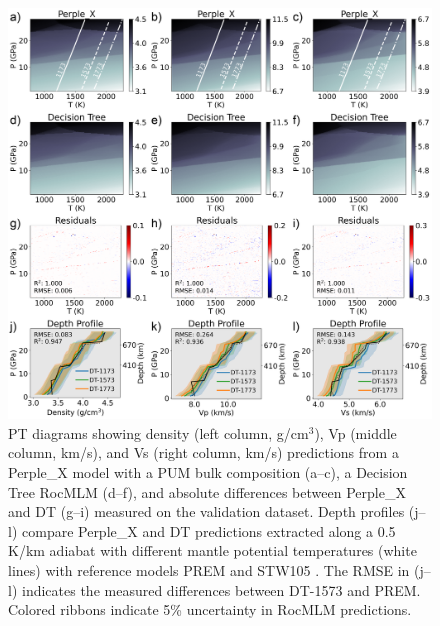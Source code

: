 \documentclass[draft,linenumbers]{agujournal2018}
\begin{document}
\begin{figure}[htbp]

{\centering \includegraphics[width=1\linewidth,]{image12-PUM-DT} 

}

\caption{PT diagrams showing density (left column, g/cm\(^3\)), Vp (middle column, km/s), and Vs (right column, km/s) predictions from a Perple\_X model with a PUM bulk composition (a--c), a Decision Tree RocMLM (d--f), and absolute differences between Perple\_X and DT (g--i) measured on the validation dataset. Depth profiles (j--l) compare Perple\_X and DT predictions extracted along a 0.5 K/km adiabat with different mantle potential temperatures (white lines) with reference models PREM \citep[solid black line,][]{dziewonski1981} and STW105 \citep[dotted black line,][]{kustowski2008}. The RMSE in (j--l) indicates the measured differences between DT-1573 and PREM. Colored ribbons indicate 5\% uncertainty in RocMLM predictions.}\label{fig:image12-PUM-DT}
\end{figure}
\end{document}
